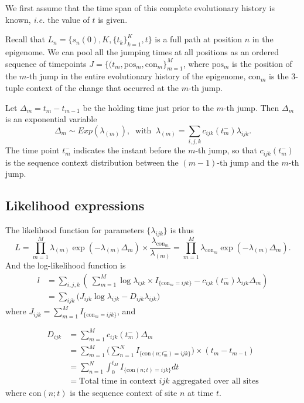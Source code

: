 \documentclass[11pt]{article}
\newcommand{\context}{\ensuremath{\mathrm{con}}}
\newcommand{\psn}{\ensuremath{\mathrm{pos}}}
\begin{document}
We first assume that the time span of this complete evolutionary
history is known, \textit{i.e.} the value of $t$ is given.

Recall that $L_n = \{s_n(0), K, \{t_k\}_{k=1}^K, t\}$ is a full path
at position $n$ in the epigenome. We can pool all the jumping times at
all positions as an ordered sequence of timepoints $J = \{(t_m, \psn{}_m,
\context{}_m\}_{m=1}^{M}$, where $\psn{}_m$ is the position of the
$m$-th jump in the entire evolutionary history of the epigenome,
$\context{}_m$ is the 3-tuple context of the change that
occurred at the $m$-th jump.

Let $\Delta_m = t_m - t_{m-1}$ be the holding time just prior to the
$m$-th jump. Then $\Delta_m$ is an exponential variable
\[
\Delta_m \sim \mathit{Exp}(\lambda_{(m)}), ~\text{ with }~
\lambda_{(m)} = \sum_{i,j,k}c_{ijk}(t_m^-)\lambda_{ijk}.
\]
The time point $t_m^-$ indicates the instant before the $m$-th jump,
so that $c_{ijk}(t_m^-)$ is the sequence context distribution between
the $(m-1)$-th jump and the $m$-th jump.

\subsection{Likelihood expressions}

The likelihood function for parameters $\{\lambda_{ijk}\}$ is thus
\begin{equation}\label{eqn:lik}
L = \prod\limits_{m=1}^{M} \lambda_{(m)} \exp(-\lambda_{(m)}\Delta_m) \times \frac{\lambda_{\context{}_m}}{\lambda_{(m)}}
=\prod\limits_{m=1}^{M}\lambda_{\context{}_m}\exp(-\lambda_{(m)}\Delta_m).
\end{equation}
And the log-likelihood function is
\begin{equation}\label{eqn:loglik1}
\begin{aligned}
l & = \sum_{i,j,k} \left(~
\sum_{m=1}^M\log\lambda_{ijk}\times I_{\{\context{}_m = ijk\}} - c_{ijk}(t_m^-)\lambda_{ijk}\Delta_m\right) \\
& = \sum\limits_{ijk} \big(J_{ijk}\log\lambda_{ijk} - D_{ijk}\lambda_{ijk} \big)
\end{aligned}
\end{equation}
where $J_{ijk} = \sum_{m=1}^M I_{\{\context{}_m = ijk\}}$, and

\begin{equation}\label{eqn:Dijk}
\begin{aligned}
D_{ijk} &= \sum_{m=1}^Mc_{ijk}(t_m^-)\Delta_m \\
& = \sum_{m=1}^M \bigg(\sum_{n=1}^{N} I_{\{\text{con}(n; t_m^-) = ijk\}}\bigg)\times(t_m - t_{m-1}) \\
& = \sum_{n=1}^{N}\int_{0}^{t_M} I_{\{\text{con}(n;t) = ijk\}} dt\\
& = \text{Total time in context $ijk$ aggregated over all sites}
\end{aligned}
\end{equation}
where $\text{con}(n; t)$ is the sequence context of site $n$ at time $t$.
\end{document}
